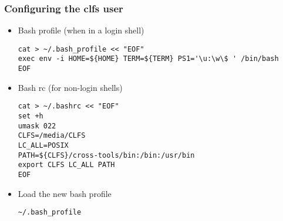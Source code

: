  \subsubsection{Configuring the clfs user}
 \begin{itemize}
  \item Bash profile (when in a login shell)
    \begin{lstlisting}
cat > ~/.bash_profile << "EOF"
exec env -i HOME=${HOME} TERM=${TERM} PS1='\u:\w\$ ' /bin/bash
EOF
    \end{lstlisting}
  \item Bash rc (for non-login shells) 
    \begin{lstlisting}
cat > ~/.bashrc << "EOF"
set +h
umask 022
CLFS=/media/CLFS
LC_ALL=POSIX
PATH=${CLFS}/cross-tools/bin:/bin:/usr/bin
export CLFS LC_ALL PATH
EOF
    \end{lstlisting}
  \item Load the new bash profile
    \begin{lstlisting}
~/.bash_profile
    \end{lstlisting}

 \end{itemize}
